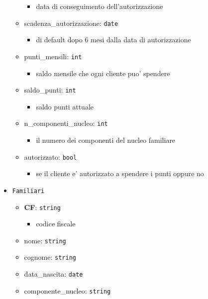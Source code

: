 \documentclass[]{article}
\providecommand{\tightlist}{%
  \setlength{\itemsep}{0pt}\setlength{\parskip}{0pt}}
\begin{document}
\begin{itemize}
\begin{itemize}
    \begin{itemize}
    \tightlist
    \item
      data di conseguimento dell'autorizzazione
    \end{itemize}
  \item
    scadenza\_autorizzazione: \texttt{date}

    \begin{itemize}
    \tightlist
    \item
      di default dopo 6 mesi dalla data di autorizzazione
    \end{itemize}
  \item
    punti\_mensili: \texttt{int}

    \begin{itemize}
    \tightlist
    \item
      saldo mensile che ogni cliente puo' spendere
    \end{itemize}
  \item
    saldo\_punti: \texttt{int}

    \begin{itemize}
    \tightlist
    \item
      saldo punti attuale
    \end{itemize}
  \item
    n\_componenti\_nucleo: \texttt{int}

    \begin{itemize}
    \tightlist
    \item
      il numero dei componenti del nucleo familiare
    \end{itemize}
  \item
    autorizzato: \texttt{bool}

    \begin{itemize}
    \tightlist
    \item
      se il cliente e' autorizzato a spendere i punti oppure no
    \end{itemize}
  \end{itemize}
\item
  \texttt{Familiari}

  \begin{itemize}
  \tightlist
  \item
    \textbf{CF}: \texttt{string}

    \begin{itemize}
    \tightlist
    \item
      codice fiscale
    \end{itemize}
  \item
    nome: \texttt{string}
  \item
    cognome: \texttt{string}
  \item
    data\_nascita: \texttt{date}
  \item
    componente\_nucleo: \texttt{string}


\end{itemize}
\end{itemize}
\end{document}
